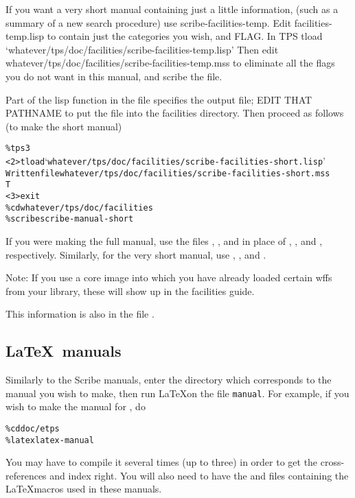 If you want a very short manual containing just a little information,
(such as a summary of a new search procedure) use scribe-facilities-temp. Edit
facilities-temp.lisp to contain just the categories you wish, and
FLAG. In TPS
tload `whatever/tps/doc/facilities/scribe-facilities-temp.lisp'
Then edit whatever/tps/doc/facilities/scribe-facilities-temp.mss
to eliminate all the flags you do not want in this manual, and
scribe the file.

Part of the lisp function in the file specifies the output file; EDIT
THAT PATHNAME to put the file into the facilities directory.
Then proceed as follows (to make the short manual)
\begin{alltt}
\% tps3
<2>tload `whatever/tps/doc/facilities/scribe-facilities-short.lisp'
Written file whatever/tps/doc/facilities/scribe-facilities-short.mss
T
<3>exit
\% cd whatever/tps/doc/facilities
\% scribe scribe-manual-short
\end{alltt}

If you were making the full manual, use the files ,
, and  in place of ,
, and , respectively. Similarly,
for the very short manual, use ,
, and .

Note: If you use a {\TPS} core image into which you have already loaded
certain wffs from your library, these will show up in the facilities
guide.

This information is also in the file .

\subsection{\LaTeX ~manuals}

Similarly to the Scribe manuals, enter the directory which corresponds to the manual you wish to make,
 then run \LaTeX on the file
{\tt manual}.  For example, if you wish to make the manual for {\ETPS}, do

\begin{alltt}
\% cd doc/etps
\% latex latex-manual
\end{alltt}

You may have to compile it several times (up to three) in order to get the cross-references and index right. You will also need to have the  and  files containing the \LaTeX macros used in these manuals.

